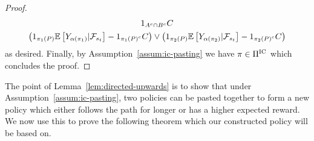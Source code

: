 \begin{proof}
\begin{gather*}
        1_{
            A^c\cap B^c
        }
        C
        \\
        \left(
            1_{
                \pi_1\left(P\right)
            }
            \mathbb{E}\left[
                Y_{
                    \alpha\left(
                        \pi_1
                    \right)
                }
                | \mathcal{F}_{s_{t}}
            \right]
            -
            1_{
                \pi_1\left(P\right)^c
            }
            C
        \right)
        \vee
        \left(
            1_{
                \pi_2\left(P\right)
            }
            \mathbb{E}\left[
                Y_{
                    \alpha\left(
                        \pi_2
                    \right)
                }
                | \mathcal{F}_{s_{t}}
            \right]
            -
            1_{
                \pi_2\left(P\right)^c
            }
            C
        \right) 
    \end{gather*}  
    as desired. Finally, by Assumption~\ref{assum:ic-pasting}
    we have $\pi\in\Pi^{\text{IC}}$ which concludes the 
    proof.
\end{proof}  

The point of Lemma~\ref{lem:directed-upwards} is to show that under Assumption~\ref{assum:ic-pasting}, 
two policies can be pasted together to form a new policy which either follows the path for longer
or has a higher expected reward.
We now use this to prove the following theorem which our constructed policy will be based on.


